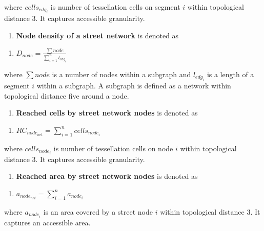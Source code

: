 \documentclass[
  letterpaper,
  DIV=11,
  numbers=noendperiod]{scrartcl}
\providecommand{\tightlist}{%
  \setlength{\itemsep}{0pt}\setlength{\parskip}{0pt}}\usepackage{longtable,booktabs,array}
\begin{document}
where \(cells_{edg_i}\) is number of tessellation cells on segment \(i\)
within topological distance 3. It captures accessible granularity.

\begin{enumerate}
\def\labelenumi{\arabic{enumi}.}
\setcounter{enumi}{43}
\tightlist
\item
  \textbf{Node density of a street network} is denoted as
\end{enumerate}

\begin{enumerate}
\def\labelenumi{(\arabic{enumi})}
\setcounter{enumi}{43}
\tightlist
\item
  \(D_{node} = \frac{\sum node}{\sum_{i=1}^{n} l_{edg_i}}\)
\end{enumerate}

where \(\sum node\) is a number of nodes within a subgraph and
\(l_{edg_i}\) is a length of a segment \(i\) within a subgraph. A
subgraph is defined as a network within topological distance five around
a node.

\begin{enumerate}
\def\labelenumi{\arabic{enumi}.}
\setcounter{enumi}{44}
\tightlist
\item
  \textbf{Reached cells by street network nodes} is denoted as
\end{enumerate}

\begin{enumerate}
\def\labelenumi{(\arabic{enumi})}
\setcounter{enumi}{44}
\tightlist
\item
  \(RC_{node_{net}} = \sum_{i=1}^{n} cells_{node_i}\)
\end{enumerate}

where \(cells_{node_i}\) is number of tessellation cells on node \(i\)
within topological distance 3. It captures accessible granularity.

\begin{enumerate}
\def\labelenumi{\arabic{enumi}.}
\setcounter{enumi}{45}
\tightlist
\item
  \textbf{Reached area by street network nodes} is denoted as
\end{enumerate}

\begin{enumerate}
\def\labelenumi{(\arabic{enumi})}
\setcounter{enumi}{45}
\tightlist
\item
  \(a_{node_{net}} = \sum_{i=1}^{n} a_{node_i}\)
\end{enumerate}

where \(a_{node_i}\) is an area covered by a street node \(i\) within
topological distance 3. It captures an accessible area.
\end{document}
